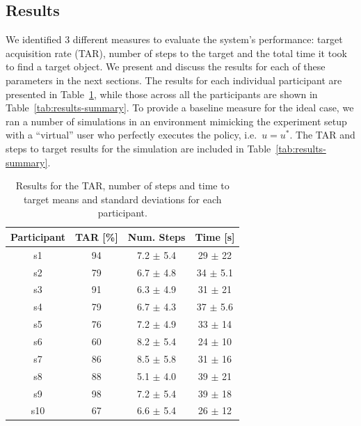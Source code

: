 \documentclass[a4paper, twoside]{article}
\begin{document}
\subsection{Results}

\noindent We identified 3 different measures to evaluate the system's performance: target acquisition rate (TAR), number of steps to the target and the total time it took to find a target object. We present and discuss the results for each of these parameters in the next sections. The results for each individual participant are presented in Table~\ref{tab:results-full}, while those across all the participants are shown in Table~\ref{tab:results-summary}. To provide a baseline measure for the ideal case, we ran a number of simulations in an environment mimicking the experiment setup with a ``virtual'' user who perfectly executes the policy, i.e.\ $u=u^*$. The TAR and steps to target results for the simulation are included in Table~\ref{tab:results-summary}.

\begin{table}
  \centering
  \caption{Results for the TAR, number of steps and time to target means and standard deviations for each participant. }\label{tab:results-full}
  \begin{tabular}{cccc}
    \toprule
    Participant & TAR [\%] & Num. Steps & Time [s] \\ \midrule
    s1 & 94 & 7.2 $\pm$ 5.4 & 29 $\pm$ 22 \\ \midrule
    s2 & 79 & 6.7 $\pm$ 4.8 & 34 $\pm$ 5.1 \\ \midrule
    s3 & 91 & 6.3 $\pm$ 4.9 & 31 $\pm$ 21 \\ \midrule
    s4 & 79 & 6.7 $\pm$ 4.3 & 37 $\pm$ 5.6 \\ \midrule
    s5 & 76 & 7.2 $\pm$ 4.9 & 33 $\pm$ 14 \\ \midrule
    s6 & 60 & 8.2 $\pm$ 5.4 & 24 $\pm$ 10 \\ \midrule
    s7 & 86 & 8.5 $\pm$ 5.8 & 31 $\pm$ 16 \\ \midrule
    s8 & 88 & 5.1 $\pm$ 4.0 & 39 $\pm$ 21 \\ \midrule
    s9 & 98 & 7.2 $\pm$ 5.4 & 39 $\pm$ 18 \\ \midrule
    s10 & 67 & 6.6 $\pm$ 5.4 & 26 $\pm$ 12 \\ \midrule
    \bottomrule                    
  \end{tabular}                    
\end{table}                        
                                   
\end{document}
